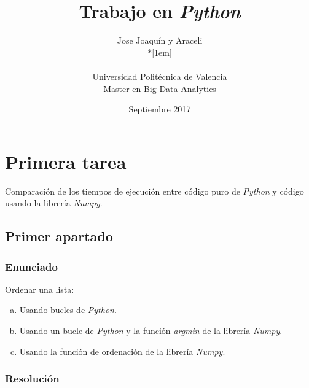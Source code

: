 \documentclass[12pt,twoside]{article}
\title{Trabajo en \textit{Python}}
\author{Jose Joaquín y Araceli\\*[1em]
\begin{minipage}{0.75\textwidth}
\footnotesize \itshape
\begin{center}
Universidad Politécnica de Valencia \\
Master en Big Data Analytics
\end{center}
\end{minipage}
}
\date{Septiembre 2017}
\begin{document}
\maketitle
%



\section{Primera tarea}

Comparación de los tiempos de ejecución entre código puro de \textit{Python} y código usando la librería \textit{Numpy}.

\subsection{Primer apartado}

\subsubsection{Enunciado}

\noindent
Ordenar una lista:

\begin{enumerate}[(a)]

\item Usando bucles de \textit{Python}.

\item Usando un bucle de \textit{Python} y la función \textit{argmin} de la librería \textit{Numpy}.

\item Usando la función de ordenación de la librería \textit{Numpy}.

\end{enumerate}

\subsubsection{Resolución}
\end{document}

